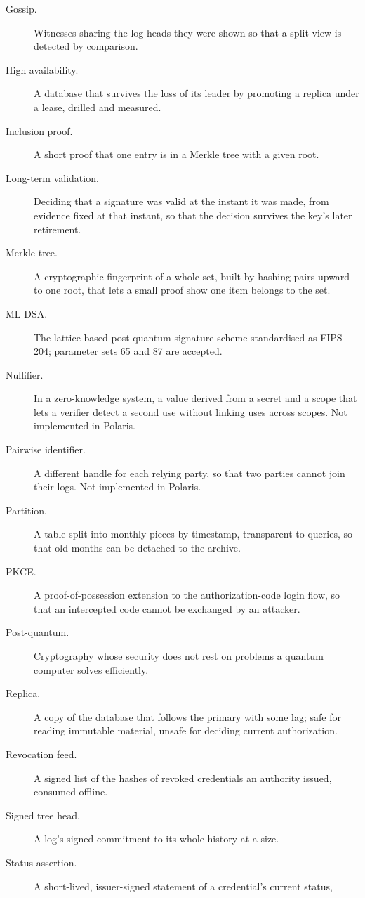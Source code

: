 \begin{description}
  \item[Gossip.] Witnesses sharing the log heads they were shown so that a split view is detected by
    comparison.
  \item[High availability.] A database that survives the loss of its leader by promoting a replica
    under a lease, drilled and measured.
  \item[Inclusion proof.] A short proof that one entry is in a Merkle tree with a given root.
  \item[Long-term validation.] Deciding that a signature was valid at the instant it was made, from
    evidence fixed at that instant, so that the decision survives the key's later retirement.
  \item[Merkle tree.] A cryptographic fingerprint of a whole set, built by hashing pairs upward to one
    root, that lets a small proof show one item belongs to the set.
  \item[ML-DSA.] The lattice-based post-quantum signature scheme standardised as FIPS 204;
    parameter sets 65 and 87 are accepted.
  \item[Nullifier.] In a zero-knowledge system, a value derived from a secret and a scope that lets a
    verifier detect a second use without linking uses across scopes. Not implemented in Polaris.
  \item[Pairwise identifier.] A different handle for each relying party, so that two parties cannot
    join their logs. Not implemented in Polaris.
  \item[Partition.] A table split into monthly pieces by timestamp, transparent to queries, so that
    old months can be detached to the archive.
  \item[PKCE.] A proof-of-possession extension to the authorization-code login flow, so that an
    intercepted code cannot be exchanged by an attacker.
  \item[Post-quantum.] Cryptography whose security does not rest on problems a quantum computer
    solves efficiently.
  \item[Replica.] A copy of the database that follows the primary with some lag; safe for reading
    immutable material, unsafe for deciding current authorization.
  \item[Revocation feed.] A signed list of the hashes of revoked credentials an authority issued,
    consumed offline.
  \item[Signed tree head.] A log's signed commitment to its whole history at a size.
  \item[Status assertion.] A short-lived, issuer-signed statement of a credential's current status,

\end{description}
